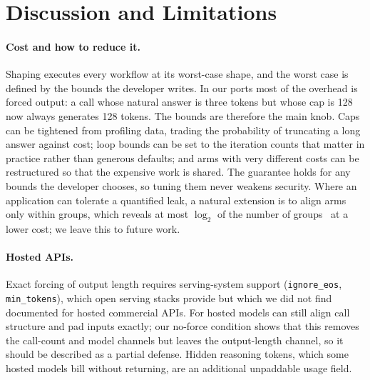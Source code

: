 \section{Discussion and Limitations}\label{sec:discussion}

\paragraph{Cost and how to reduce it.} Shaping executes every workflow at its worst-case shape, and the worst case is defined by the bounds the developer writes. In our ports most of the overhead is forced output: a call whose natural answer is three tokens but whose cap is 128 now always generates 128 tokens. The bounds are therefore the main knob. Caps can be tightened from profiling data, trading the probability of truncating a long answer against cost; loop bounds can be set to the iteration counts that matter in practice rather than generous defaults; and arms with very different costs can be restructured so that the expensive work is shared. The guarantee holds for any bounds the developer chooses, so tuning them never weakens security. Where an application can tolerate a quantified leak, a natural extension is to align arms only within groups, which reveals at most $\log_2$ of the number of groups~\cite{smith2009qif} at a lower cost; we leave this to future work.

\paragraph{Hosted APIs.} Exact forcing of output length requires serving-system support (\texttt{ignore\_eos}, \texttt{min\_tokens}), which open serving stacks provide but which we did not find documented for hosted commercial APIs. For hosted models \sys can still align call structure and pad inputs exactly; our no-force condition shows that this removes the call-count and model channels but leaves the output-length channel, so it should be described as a partial defense. Hidden reasoning tokens, which some hosted models bill without returning, are an additional unpaddable usage field.

